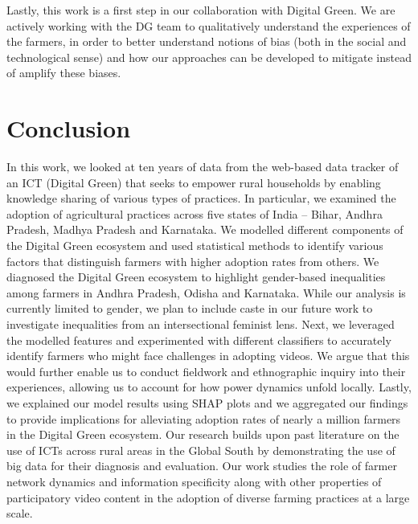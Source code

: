 \documentclass[manuscript,screen]{acmart}
\begin{document}
Lastly, this work is a first step in our collaboration with Digital Green. We are actively working with the DG team to qualitatively understand the experiences of the farmers, in order to better understand notions of bias (both in the social and technological sense) and how our approaches can be developed to mitigate instead of amplify these biases. %


\section{Conclusion}\label{discussion}

In this work, we looked at ten years of data from the web-based data tracker of an ICT (Digital Green) that seeks to empower rural households by enabling knowledge sharing of various types of practices. In particular, we examined the adoption of agricultural practices across five states of India -- Bihar, Andhra Pradesh, Madhya Pradesh and Karnataka. We modelled different components of the Digital Green ecosystem and used statistical methods to identify various factors that distinguish farmers with higher adoption rates from others. We diagnosed the Digital Green ecosystem to highlight gender-based inequalities among farmers in Andhra Pradesh, Odisha and Karnataka. While our analysis is currently limited to gender, we plan to include caste in our future work to investigate inequalities from an intersectional feminist lens. Next, we leveraged the modelled features and experimented with different classifiers to accurately identify farmers who might face challenges in adopting videos. We argue that this would further enable us to conduct fieldwork and ethnographic inquiry into their experiences, allowing us to account for how power dynamics unfold locally. Lastly, we explained our model results using SHAP plots and we aggregated our findings to provide implications for alleviating adoption rates of nearly a million farmers in the Digital Green ecosystem. Our research builds upon past literature on the use of ICTs across rural areas in the Global South by demonstrating the use of big data for their diagnosis and evaluation. Our work studies the role of farmer network dynamics and information specificity along with other properties of participatory video content in the adoption of diverse farming practices at a large scale. 
\end{document}
